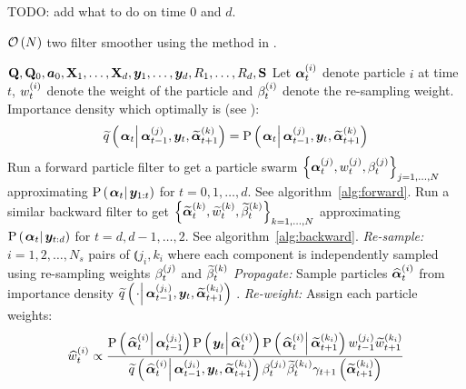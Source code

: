 TODO: add what to do on time 0 and $d$.

\begin{algorithm}
\caption{$\mathcal{O}\left( N\right)$ two filter smoother using the method in \cite{fearnhead10}.}\label{alg:ONsmoother}
\begin{algorithmic}[1]\raggedright
\INPUT
\Statex $\mathbf{Q},\mathbf{Q}_0,\bm{a}_0,\mathbf{X}_1,\dots,\mathbf{X}_d,\bm{y}_1,\dots,\bm{y}_d,R_1,\dots,R_d,\mathbf{S}$
%
\Statex Let $\bm{\alpha}_{t}^{\left( i\right)}$ denote particle $i$ at time $t$, $w_{t}^{\left( i\right)}$ denote the weight of the particle and $\beta_{t}^{\left( i\right)}$ denote the re-sampling weight.
%
\Statex Importance density which optimally is (see \citet[page 453]{fearnhead10}): 
\Statex \begin{equation}
	\IDAproxC{\vec{\alpha}_t}{\partic{\vec{\alpha}}{t-1}{j},\vec{y}_t, \particB{\vec{\alpha}}{t+1}{k}} = 
%
	\propC{\vec{\alpha}_t}{\partic{\vec{\alpha}}{t-1}{j},\vec{y}_t, \particB{\vec{\alpha}}{t+1}{k}}
\end{equation}
%
\State Run a forward particle filter to get a particle swarm %
	$\left\{ \bm{\alpha}_{t}^{\left( j\right)}, w_{t}^{\left( j\right)}, \beta_{t}^{\left( j\right)}\right\}_{j=1,\dots,N}$ %
	approximating $\propC{\vec{\alpha}_t}{\vec{y}_{1:t}}$ for $t = 0, 1, \dots, d$. See algorithm~\ref{alg:forward}.
\EndProcedure
%
\State Run a similar backward filter to get %
	$\left\{ \widetilde{\bm{\alpha}}_{t}^{\left( k\right)}, \widetilde{w}_{t}^{\left( k\right)}, \widetilde{\beta}_{t}^{\left( k\right)}\right\}_{k=1,\dots,N}$  %
	approximating $\propC{\vec{\alpha}_t}{\vec{y}_{t:d}}$ for $t = d, d-1, \dots , 2$. See algorithm~\ref{alg:backward}.
\EndProcedure
% 
\StateXX \emph{Re-sample:}
\State $i=1,2,\dots,N_s$ pairs of $\Lparen{j_i, k_i}$ where each component is independently sampled using re-sampling weights $\beta_{t}^{\left( j\right)}$ and $\widetilde{\beta}_{t}^{\left( k\right)}$
%
\StateXX \emph{Propagate:} 
\State Sample particles $\widehat{\bm{\alpha}}_{t}^{\left( i\right)}$ from importance density %
	$\IDAproxC{\cdot}{\partic{\vec{\alpha}}{t-1}{j_i},\vec{y}_t, \particB{\vec{\alpha}}{t + 1}{k_i}}$
.%
\StateXX \emph{Re-weight:}
\State Assign each particle weights:
\StateXX \begin{equation}\label{eqn:combineWeight}
 \particS{w}{t}{i} \propto \frac{
 	\propC{\particS{\vec{\alpha}}{t}{i}}{\partic{\vec{\alpha}}{t - 1}{j_i}}
 	\propC{\vec{y}_t}{\particS{\vec{\alpha}}{t}{i}}
 	\propC{\particS{\vec{\alpha}}{t}{i}}{\particB{\vec{\alpha}}{t + 1}{k_i}}
 	\partic{w}{t - 1}{j_i}\particB{w}{t + 1}{k_i}
 	}{ %
 	\IDAproxC{\particS{\vec{\alpha}}{t}{i}}{\partic{\vec{\alpha}}{t-1}{j_i},\vec{y}_t, \particB{\vec{\alpha}}{t+1}{k_i}}
 	\partic{\beta}{t}{j_i}\particB{\beta}{t}{k_i}\gamma_{t +1}\Lparen{\particB{\vec{\alpha}}{t+1}{k_i}}
 	} %
\end{equation}
\EndFor
\EndProcedure
\end{algorithmic}
\end{algorithm}




